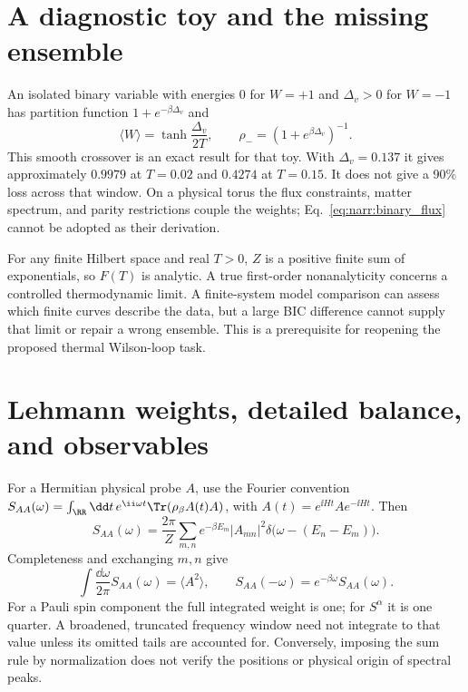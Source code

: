 \section{A diagnostic toy and the missing ensemble}
An isolated binary variable with energies $0$ for $W=+1$ and $\Delta_v>0$ for
$W=-1$ has partition function $1+e^{-\beta\Delta_v}$ and
\begin{equation}
 \langle W\rangle=\tanh\frac{\Delta_v}{2T},\qquad
 \rho_-=(1+e^{\beta\Delta_v})^{-1}.
 \label{eq:narr:binary_flux}
\end{equation}
This smooth crossover is an exact result for that toy. With $\Delta_v=0.137$
it gives approximately $0.9979$ at $T=0.02$ and $0.4274$ at $T=0.15$.
It does not give a 90\% loss across that window. On a physical torus the flux
constraints, matter spectrum, and parity restrictions couple the weights;
Eq.~\eqref{eq:narr:binary_flux} cannot be adopted as their derivation.

For any finite Hilbert space and real $T>0$, $Z$ is a positive finite sum of
exponentials, so $F(T)$ is analytic. A true first-order nonanalyticity concerns
a controlled thermodynamic limit. A finite-system model comparison can assess
which finite curves describe the data, but a large BIC difference cannot supply
that limit or repair a wrong ensemble. This is a prerequisite for reopening the
proposed thermal Wilson-loop task.

\section{Lehmann weights, detailed balance, and observables}
For a Hermitian physical probe $A$, use the Fourier convention
$S_{AA}(\omega)=\int_{\RR}\dd t\,e^{\ii\omega t}
\Tr(\rho_\beta A(t)A)$, with $A(t)=e^{\ii Ht}Ae^{-\ii Ht}$. Then
\begin{equation}
 S_{AA}(\omega)=\frac{2\pi}{Z}\sum_{m,n}e^{-\beta E_m}|A_{mn}|^2
  \delta\bigl(\omega-(E_n-E_m)\bigr).
 \label{eq:narr:lehmann}
\end{equation}
Completeness and exchanging $m,n$ give
\begin{equation}
 \int\frac{\dd\omega}{2\pi}S_{AA}(\omega)=\langle A^2\rangle,
 \qquad S_{AA}(-\omega)=e^{-\beta\omega}S_{AA}(\omega).
 \label{eq:narr:kms}
\end{equation}
For a Pauli spin component the full integrated weight is one; for $S^\alpha$
it is one quarter. A broadened, truncated frequency window need not integrate
to that value unless its omitted tails are accounted for. Conversely, imposing
the sum rule by normalization does not verify the positions or physical origin
of spectral peaks.

